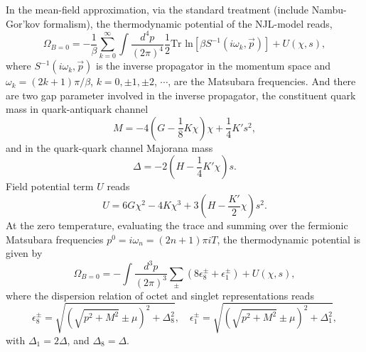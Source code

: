 \documentclass[prd, showpacs,nofootinbib,amsmath,amssymb]{revtex4}
\begin{document}

In the mean-field approximation, via the standard treatment (include Nambu-Gor'kov formalism), the thermodynamic potential of the NJL-model reads,
\begin{equation}
\label{eq:omega}
\Omega_{B=0} = -\frac{1}{\beta}\sum_{k=0}^{\infty}\int \frac{d^4p}{(2\pi)^4}
\frac{1}{2}\text{Tr ln}[\beta S^{-1}(i\omega_k,\vec{p})]
+ U(\chi,s),
\end{equation}
where $S^{-1}(i\omega_k,\vec{p})$ is the inverse propagator in the momentum space and $\omega_k = (2k+1)\pi/\beta$, $k =0, \pm 1, \pm 2$, $\cdots$, are the Matsubara frequencies.
And there are two gap parameter involved in the inverse propagator,
the constituent quark mass in quark-antiquark channel
\begin{equation}
M = -4(G-\frac{1}{8}K\chi)\chi + \frac{1}{4}K's^2,
\end{equation}
and in the quark-quark channel Majorana mass
\begin{equation}
\Delta = -2(H - \frac{1}{4}K'\chi)s.
\end{equation}
Field potential term $U$ reads
\begin{equation}
\label{eq:u}
U = 6G\chi^2 - 4K\chi^3 + 3(H-\frac{K'}{2}\chi)s^2.
\end{equation}
At the zero temperature, evaluating the trace and summing over the fermionic Matsubara frequencies $p^0=i\omega_n=(2n+1)\pi iT$, the thermodynamic potential is given by
\begin{equation}
\Omega_{B=0}=-\int\frac{d^3p}{(2\pi)^3}\sum_{\pm}(8\epsilon^{\pm}_8+\epsilon^{\pm}_1)+U(\chi,s),
\end{equation}
where the dispersion relation of octet and singlet representations reads
\begin{equation}
\epsilon^{\pm}_8=\sqrt{(\sqrt{p^2+M^2}\pm\mu)^2+\Delta^2_8},\quad
\epsilon^{\pm}_1=\sqrt{(\sqrt{p^2+M^2}\pm\mu)^2+\Delta^2_1},
\end{equation}
with $\Delta_1=2\Delta$, and $\Delta_8=\Delta$.
\end{document}
